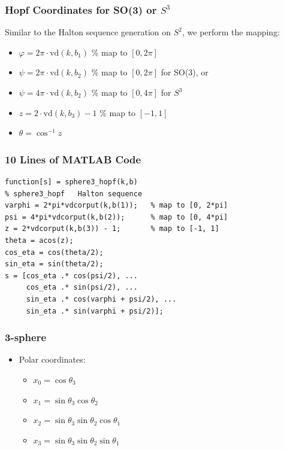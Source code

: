 \documentclass[serif]{beamer} %
\begin{document}
\begin{frame}[fragile]
\frametitle{Hopf Coordinates for SO(3) or $S^3$}
  Similar to the Halton sequence generation on $S^2$, we perform the mapping:
  \begin{itemize}
    \item $\varphi = 2\pi\cdot\mathrm{vd}(k,b_1)$ \% map to $[0,2\pi] $
    \item $\psi = 2\pi\cdot\mathrm{vd}(k,b_2)$ \% map to $[0,2\pi] $ for SO(3), or
    \item $\psi = 4\pi\cdot\mathrm{vd}(k,b_2)$ \% map to $[0,4\pi] $ for $S^3$
    \item $z = 2\cdot\mathrm{vd}(k,b_3) - 1$ \% map to $[-1,1]$
    \item $\theta = \cos^{-1}z$
  \end{itemize}
\end{frame}

\begin{frame}[fragile]
\frametitle{10 Lines of MATLAB Code}
\begin{lstlisting}
function[s] = sphere3_hopf(k,b)
% sphere3_hopf   Halton sequence
varphi = 2*pi*vdcorput(k,b(1));   % map to [0, 2*pi]
psi = 4*pi*vdcorput(k,b(2));      % map to [0, 4*pi]
z = 2*vdcorput(k,b(3)) - 1;       % map to [-1, 1]
theta = acos(z);
cos_eta = cos(theta/2);
sin_eta = sin(theta/2);
s = [cos_eta .* cos(psi/2), ...
     cos_eta .* sin(psi/2), ...
     sin_eta .* cos(varphi + psi/2), ...
     sin_eta .* sin(varphi + psi/2)];
\end{lstlisting}
\end{frame}

\begin{frame}
  \frametitle{3-sphere}
  \begin{itemize}
    \item Polar coordinates:
    \begin{itemize}
      \item $x_0 = \cos\theta_3$
      \item $x_1 = \sin\theta_3 \cos\theta_2$
      \item $x_2 = \sin\theta_3 \sin\theta_2 \cos\theta_1$
      \item $x_3 = \sin\theta_3 \sin\theta_2 \sin\theta_1$
    \end{itemize}
  \end{itemize}
\end{frame}
\end{document}
